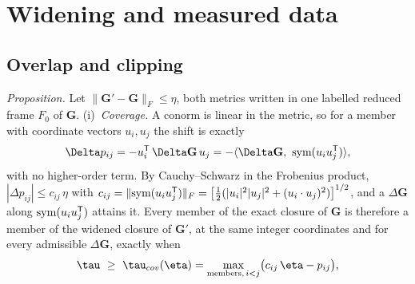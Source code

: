 \documentclass[preprint,pdf]{iucr}          %
\newcommand{\Gmet}{\mathbf{G}}
\begin{document}
\section{Widening and measured data}
\label{app:widening}

\subsection{Overlap and clipping}
\emph{Proposition.} Let $\|\Gmet'-\Gmet\|_F\le\eta$, both metrics written in one labelled reduced frame $F_0$ of $\Gmet$. (i)~\emph{Coverage.} A conorm is linear in the metric, so for a member with coordinate vectors $u_i,u_j$ the shift is exactly
\[
\Delta p_{ij}=-u_i^{\sf T}\,\Delta\Gmet\,u_j=-\langle\Delta\Gmet,\ \mathrm{sym}(u_iu_j^{\sf T})\rangle ,
\]
with no higher-order term. By Cauchy--Schwarz in the Frobenius product, $|\Delta p_{ij}|\le c_{ij}\,\eta$ with $c_{ij}=\|\mathrm{sym}(u_iu_j^{\sf T})\|_F=\bigl[\tfrac12(|u_i|^2|u_j|^2+(u_i\cdot u_j)^2)\bigr]^{1/2}$, and a $\Delta\Gmet$ along $\mathrm{sym}(u_iu_j^{\sf T})$ attains it. Every member of the exact closure of $\Gmet$ is therefore a member of the widened closure of $\Gmet'$, at the same integer coordinates and for every admissible $\Delta\Gmet$, exactly when
\[
\tau\ \ge\ \tau_{\rm cov}(\eta)=\max_{\text{members},\,i<j}\bigl(c_{ij}\,\eta-p_{ij}\bigr),
\]
\end{document}
